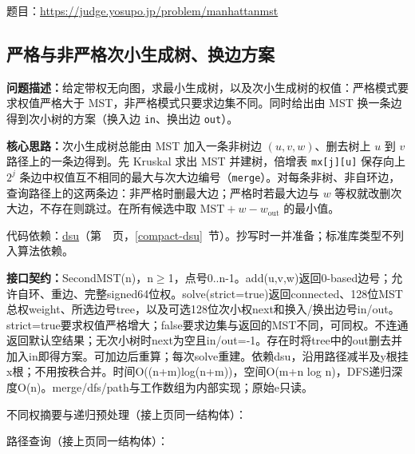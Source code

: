 题目：\url{https://judge.yosupo.jp/problem/manhattanmst}



\subsection{严格与非严格次小生成树、换边方案}\label{compact-SecondMST}

\noindent\textbf{问题描述：}\allowbreak 给定带权无向图，求最小生成树，以及次小生成树的权值：严格模式要求权值严格大于 MST，非严格模式只要求边集不同。同时给出由 MST 换一条边得到次小树的方案（换入边 \texttt{in}、换出边 \texttt{out}）。

\textbf{核心思路：}\allowbreak 次小生成树总能由 MST 加入一条非树边 $(u,v,w)$、删去树上 $u$ 到 $v$ 路径上的一条边得到。先 Kruskal 求出 MST 并建树，倍增表 \texttt{mx[j][u]} 保存向上 $2^j$ 条边中权值互不相同的最大与次大边编号（\texttt{merge}）。对每条非树、非自环边，查询路径上的这两条边：非严格时删最大边；严格时若最大边与 $w$ 等权就改删次大边，不存在则跳过。在所有候选中取 $\text{MST}+w-w_{\text{out}}$ 的最小值。

代码依赖：\hyperref[compact-dsu]{dsu}（第~\pageref{compact-dsu}~页，\ref{compact-dsu}~节）。抄写时一并准备；标准库类型不列入算法依赖。

{\sloppy{}\noindent\textbf{接口契约：}SecondMST(n)，n$\ge$1，点号0..n-1。add(u,v,w)返回0-based边号；允许自环、重边、完整signed64位权。solve(strict=true)返回connected、128位MST总权weight、所选边号tree，以及可选128位次小权next和换入/换出边号in/out。strict=true要求权值严格增大；false要求边集与返回的MST不同，可同权。不连通返回默认空结果；无次小树时next为空且in/out=-1。存在时将tree中的out删去并加入in即得方案。可加边后重算；每次solve重建。依赖dsu，沿用路径减半及y根挂x根；不用按秩合并。时间O((n+m)log(n+m))，空间O(m+n log n)，DFS递归深度O(n)。merge/dfs/path与工作数组为内部实现；原始e只读。\par}

\Needspace{506pt}



\newpage

\noindent 不同权摘要与递归预处理（接上页同一结构体）：



\newpage

\noindent 路径查询（接上页同一结构体）：

